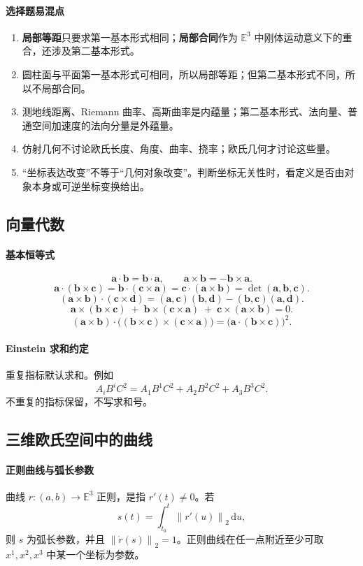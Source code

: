 \documentclass[UTF8,12pt,a4paper]{ctexart}
\newcommand{\E}{\mathbb E}
\newcommand{\dd}{\,\mathrm d}
\newcommand{\vct}[1]{\boldsymbol{#1}}
\newcommand{\norm}[1]{\left\lVert #1\right\rVert}
\newcommand{\inner}[2]{\left(#1,#2\right)}
\begin{document}
\paragraph{选择题易混点}
\begin{enumerate}
\item \textbf{局部等距}只要求第一基本形式相同；\textbf{局部合同}作为 $\E^3$ 中刚体运动意义下的重合，还涉及第二基本形式。
\item 圆柱面与平面第一基本形式可相同，所以局部等距；但第二基本形式不同，所以不局部合同。
\item 测地线距离、Riemann 曲率、高斯曲率是内蕴量；第二基本形式、法向量、普通空间加速度的法向分量是外蕴量。
\item 仿射几何不讨论欧氏长度、角度、曲率、挠率；欧氏几何才讨论这些量。
\item ``坐标表达改变''不等于``几何对象改变''。判断坐标无关性时，看定义是否由对象本身或可逆坐标变换给出。
\end{enumerate}

\subsection{向量代数}
\paragraph{基本恒等式}
\[
\vct a\cdot\vct b=\vct b\cdot\vct a,\qquad
\vct a\times\vct b=-\vct b\times\vct a.
\]
\[
\vct a\cdot(\vct b\times\vct c)
=\vct b\cdot(\vct c\times\vct a)
=\vct c\cdot(\vct a\times\vct b)
=\det(\vct a,\vct b,\vct c).
\]
\[
(\vct a\times\vct b)\cdot(\vct c\times\vct d)
=\inner{\vct a}{\vct c}\inner{\vct b}{\vct d}
-\inner{\vct b}{\vct c}\inner{\vct a}{\vct d}.
\]
\[
\vct a\times(\vct b\times\vct c)
\;+\;\vct b\times(\vct c\times\vct a)
\;+\;\vct c\times(\vct a\times\vct b)=0.
\]
\[
(\vct a\times\vct b)\cdot\bigl((\vct b\times\vct c)\times(\vct c\times\vct a)\bigr)
=\bigl(\vct a\cdot(\vct b\times\vct c)\bigr)^2.
\]

\paragraph{Einstein 求和约定}
重复指标默认求和。例如
\[
A_iB^iC^2=A_1B^1C^2+A_2B^2C^2+A_3B^3C^2.
\]
不重复的指标保留，不写求和号。

\subsection{三维欧氏空间中的曲线}
\paragraph{正则曲线与弧长参数}
曲线 $r:(a,b)\to\E^3$ 正则，是指 $r'(t)\ne0$。若
\[
s(t)=\int_{t_0}^{t}\norm{r'(u)}_2\dd u,
\]
则 $s$ 为弧长参数，并且 $\norm{\dot r(s)}_2=1$。正则曲线在任一点附近至少可取 $x^1,x^2,x^3$ 中某一个坐标为参数。
\end{document}
